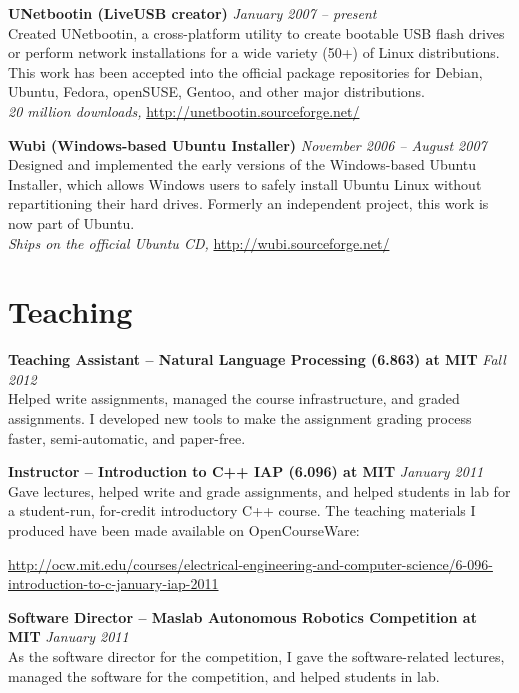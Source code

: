 \documentclass[margin,line]{resume}
\begin{document}
\begin{resume}
\textbf{UNetbootin (LiveUSB creator)} \hfill \textsl{January 2007 -- present}\\
Created UNetbootin, a cross-platform utility to create bootable USB flash drives or perform network installations for a wide variety (50+) of Linux distributions. This work has been accepted into the official package repositories for Debian, Ubuntu, Fedora, openSUSE, Gentoo, and other major distributions. \\
\emph{20 million downloads,} \url{http://unetbootin.sourceforge.net/}

\textbf{Wubi (Windows-based Ubuntu Installer)} \hfill \textsl{November 2006 -- August 2007}\\
Designed and implemented the early versions of the Windows-based Ubuntu Installer, which allows Windows users to safely install Ubuntu Linux without repartitioning their hard drives. Formerly an independent project, this work is now part of Ubuntu. \\
\emph{Ships on the official Ubuntu CD,} \url{http://wubi.sourceforge.net/}

\pagebreak

\section{\mysidestyle Teaching}

\textbf{Teaching Assistant -- Natural Language Processing (6.863) at MIT} \hfill \textsl{Fall 2012} \\
Helped write assignments, managed the course infrastructure, and graded assignments. I developed new tools to make the assignment grading process faster, semi-automatic, and paper-free.

\textbf{Instructor -- Introduction to C++ IAP (6.096) at MIT} \hfill \textsl{January 2011}\\
Gave lectures, helped write and grade assignments, and helped students in lab for a student-run, for-credit introductory C++ course. The teaching materials I produced have been made available on OpenCourseWare:

\vspace{-4mm}

\url{http://ocw.mit.edu/courses/electrical-engineering-and-computer-science/6-096-introduction-to-c-january-iap-2011} \\

\vspace{-5mm}

\textbf{Software Director -- Maslab Autonomous Robotics Competition at MIT} \hfill \textsl{January 2011}\\
As the software director for the competition, I gave the software-related lectures,
managed the software for the competition, and helped students in lab.


\end{resume}
\end{document}
